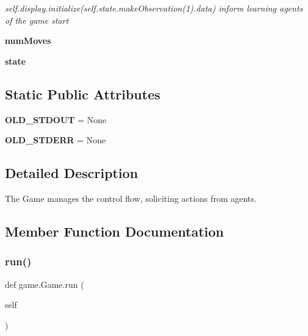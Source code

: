 \begin{DoxyCompactItemize}
\begin{DoxyCompactList}\small\item\em self.\+display.\+initialize(self.\+state.\+make\+Observation(1).data) inform learning agents of the game start \end{DoxyCompactList}\item 
\mbox{\label{classgame_1_1_game_a3951c9397f2f303a0724b35622d86b9d}} 
{\bfseries num\+Moves}
\item 
\mbox{\label{classgame_1_1_game_a3467c8e943cb5c048b3b45bc9b563311}} 
{\bfseries state}
\end{DoxyCompactItemize}
\subsection*{Static Public Attributes}
\begin{DoxyCompactItemize}
\item 
\mbox{\label{classgame_1_1_game_a89eff163f532c2e5c8c85f996b4cf936}} 
{\bfseries O\+L\+D\+\_\+\+S\+T\+D\+O\+UT} = None
\item 
\mbox{\label{classgame_1_1_game_aaacc3bad55fb2cd0f91acfff08397f9f}} 
{\bfseries O\+L\+D\+\_\+\+S\+T\+D\+E\+RR} = None
\end{DoxyCompactItemize}


\subsection{Detailed Description}
\begin{DoxyVerb}The Game manages the control flow, soliciting actions from agents.
\end{DoxyVerb}
 

\subsection{Member Function Documentation}
\mbox{\label{classgame_1_1_game_a5ac60e090ecb22edd8fe33073b45866e}} 
\subsubsection{\texorpdfstring{run()}{run()}}
{\footnotesize\ttfamily def game.\+Game.\+run (\begin{DoxyParamCaption}\item[{}]{self }\end{DoxyParamCaption})}

